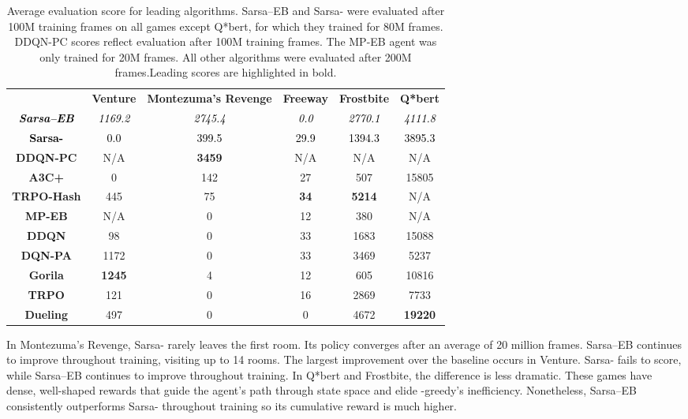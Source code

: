 \documentclass{article}
\providecommand{\tabularnewline}{\\}
\theoremstyle{definition}
\theoremstyle{definition}
\theoremstyle{plain}
\theoremstyle{plain}
\theoremstyle{plain}
\begin{document}
\begin{table*}[t]
\begin{centering}
\begin{tabular}{cccccc}
 & \textbf{Venture} & \textbf{Montezuma's Revenge} & \textbf{Freeway} & \textbf{Frostbite} & \textbf{Q{*}bert}\tabularnewline\addlinespace
\midrule
\midrule 
\textbf{\textit{\textcolor{black}{Sarsa--EB}}} & \textit{\textcolor{black}{1169.2}} & \textit{\textcolor{black}{2745.4}} & \textit{\textcolor{black}{0.0}} & \textit{\textcolor{black}{2770.1}} & \textit{\textcolor{black}{4111.8}}\tabularnewline
\midrule 
\textbf{\textcolor{black}{Sarsa-}} & \textcolor{black}{0.0} & \textcolor{black}{399.5} & \textcolor{black}{29.9} & \textcolor{black}{1394.3} & \textcolor{black}{3895.3}\tabularnewline
\midrule
\midrule 
\textbf{DDQN-PC} & N/A & \textbf{3459} & N/A & N/A & N/A\tabularnewline
\midrule 
\textbf{A3C+} & 0 & 142 & 27 & 507 & 15805\tabularnewline
\midrule 
\textbf{TRPO-Hash} & 445 & 75 & \textbf{34} & \textbf{5214} & N/A\tabularnewline
\midrule 
\textbf{MP-EB} & N/A & 0 & 12 & 380 & N/A\tabularnewline
\midrule
\midrule 
\textbf{DDQN} & 98 & 0 & 33 & 1683 & 15088\tabularnewline
\midrule 
\textbf{DQN-PA} & 1172 & 0 & 33 & 3469 & 5237\tabularnewline
\midrule 
\textbf{Gorila} & \textbf{1245} & 4 & 12 & 605 & 10816\tabularnewline
\midrule 
\textbf{TRPO } & 121 & 0 & 16 & 2869 & 7733\tabularnewline
\midrule 
\textbf{Dueling} & 497 & 0 & 0 & 4672 & \textbf{19220}\tabularnewline
\bottomrule
\end{tabular}
\par\end{centering}

\caption{Average evaluation score for leading algorithms. Sarsa--EB
and Sarsa- were evaluated after 100M training frames on
all games except Q{*}bert, for which they trained for 80M frames.
DDQN-PC scores reflect evaluation after 100M training frames. The
MP-EB agent was only trained for 20M frames. All other algorithms
were evaluated after 200M frames.\label{table} Leading scores are
highlighted in bold.}
\end{table*}
 In Montezuma's Revenge, Sarsa- rarely leaves the first
room. Its policy converges after an average of 20 million frames.
Sarsa--EB continues to improve throughout training, visiting
up to 14 rooms. The largest improvement over the baseline occurs in
Venture. Sarsa- fails to score, while Sarsa--EB
continues to improve throughout training. In Q{*}bert and Frostbite,
the difference is less dramatic. These games have dense, well-shaped
rewards that guide the agent's path through state space and elide
-greedy's inefficiency. Nonetheless, Sarsa--EB consistently
outperforms Sarsa- throughout training so its cumulative
reward is much higher. 
\end{document}
